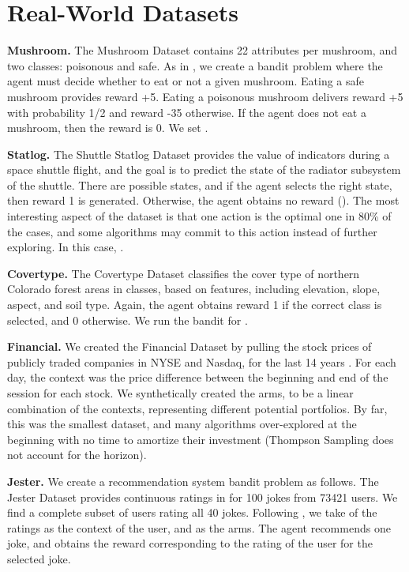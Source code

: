 \documentclass{article} \usepackage{iclr2018_conference,times}
\begin{document}
\clearpage

\section{Real-World Datasets}\label{s:datasets}

\textbf{Mushroom.} The Mushroom Dataset \citep{schlimmer1981mushroom} contains 22 attributes per mushroom, and two classes: poisonous and safe. As in \cite{blundell2015weight}, we create a bandit problem where the agent must decide whether to eat or not a given mushroom.
Eating a safe mushroom provides reward +5.
Eating a poisonous mushroom delivers reward +5 with probability 1/2 and reward -35 otherwise.
If the agent does not eat a mushroom, then the reward is 0.
We set .


\textbf{Statlog.} The Shuttle Statlog Dataset \citep{asuncion2007uci} provides the value of  indicators during a space shuttle flight, and the goal is to predict the state of the radiator subsystem of the shuttle.
There are  possible states, and if the agent selects the right state, then reward 1 is generated.
Otherwise, the agent obtains no reward ().
The most interesting aspect of the dataset is that one action is the optimal one in 80\% of the cases, and some algorithms may commit to this action instead of further exploring.
In this case, .


\textbf{Covertype.} The Covertype Dataset \citep{asuncion2007uci} classifies the cover type of northern Colorado forest areas in  classes, based on  features, including elevation, slope, aspect, and soil type.
Again, the agent obtains reward 1 if the correct class is selected, and 0 otherwise.
We run the bandit for .

\textbf{Financial.} We created the Financial Dataset by pulling the stock prices of  publicly traded companies in NYSE and Nasdaq, for the last 14 years .
For each day, the context was the price difference between the beginning and end of the session for each stock.
We synthetically created the arms, to be a linear combination of the contexts, representing  different potential portfolios.
By far, this was the smallest dataset, and many algorithms over-explored at the beginning with no time to amortize their investment (Thompson Sampling does not account for the horizon).

\textbf{Jester.} We create a recommendation system bandit problem as follows.
The Jester Dataset \citep{goldberg2001eigentaste} provides continuous ratings in  for 100 jokes from 73421 users.
We find a complete subset of  users rating all 40 jokes. Following \cite{pmlr-v70-riquelme17a}, we take  of the ratings as the context of the user, and  as the arms. The agent recommends one joke, and obtains the reward corresponding to the rating of the user for the selected joke.
\end{document}
